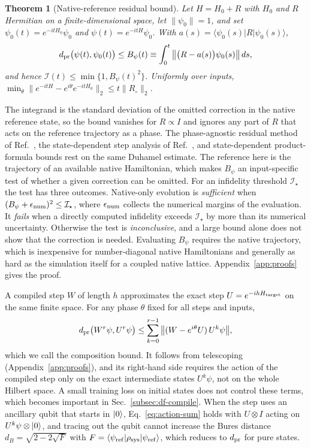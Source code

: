\documentclass[pra,twocolumn,superscriptaddress,nofootinbib,floatfix]{revtex4-2}
\newtheorem{theorem}{Theorem}
\theoremstyle{remark}
\newcommand{\dpr}{d_{\rm pr}}
\begin{document}
\begin{theorem}[Native-reference residual bound]
\label{thm:native-residual}
Let \(H=H_0+R\) with \(H_0\) and \(R\) Hermitian on a finite-dimensional space, let \(\|\psi_0\|=1\), and set \(\psi_0(t)=e^{-itH_0}\psi_0\) and \(\psi(t)=e^{-itH}\psi_0\). With \(a(s)=\langle\psi_0(s)|R|\psi_0(s)\rangle\),
\begin{align}
\dpr\big(\psi(t),\psi_0(t)\big)\le B_\psi(t)\equiv\int_0^t\big\|\big(R-a(s)\big)\psi_0(s)\big\|\,ds ,
\label{eq:native-residual}
\end{align}
and hence \(\mathcal I(t)\le\min\{1,B_\psi(t)^2\}\). Uniformly over inputs, \(\min_\theta\|e^{-itH}-e^{i\theta}e^{-itH_0}\|_2\le t\|R_\circ\|_2\).
\end{theorem}

The integrand is the standard deviation of the omitted correction in the native reference state, so the bound vanishes for \(R\propto I\) and ignores any part of \(R\) that acts on the reference trajectory as a phase. The phase-agnostic residual method of Ref.~\cite{Zoufal2023}, the state-dependent step analysis of Ref.~\cite{Hatomura2022}, and state-dependent product-formula bounds \cite{AnFangLin2021,Burgarth2024Strong} rest on the same Duhamel estimate. The reference here is the trajectory of an available native Hamiltonian, which makes \(B_\psi\) an input-specific test of whether a given correction can be omitted. For an infidelity threshold \(\mathcal I_\star\) the test has three outcomes. Native-only evolution is \emph{sufficient} when \((B_\psi+\epsilon_{\rm num})^2\le\mathcal I_\star\), where \(\epsilon_{\rm num}\) collects the numerical margins of the evaluation. It \emph{fails} when a directly computed infidelity exceeds \(\mathcal I_\star\) by more than its numerical uncertainty. Otherwise the test is \emph{inconclusive}, and a large bound alone does not show that the correction is needed. Evaluating \(B_\psi\) requires the native trajectory, which is inexpensive for number-diagonal native Hamiltonians and generally as hard as the simulation itself for a coupled native lattice. Appendix~\ref{app:proofs} gives the proof.

A compiled step \(W\) of length \(h\) approximates the exact step \(U=e^{-ihH_{\rm target}}\) on the same finite space. For any phase \(\theta\) fixed for all steps and inputs,
\begin{align}
\dpr\big(W^r\psi,U^r\psi\big)\le\sum_{k=0}^{r-1}\big\|(W-e^{i\theta}U)\,U^k\psi\big\| ,
\label{eq:action-sum}
\end{align}
which we call the composition bound. It follows from telescoping (Appendix~\ref{app:proofs}), and its right-hand side requires the action of the compiled step only on the exact intermediate states \(U^k\psi\), not on the whole Hilbert space. A small training loss on initial states does not control these terms, which becomes important in Sec.~\ref{subsec:df-compile}. When the step uses an ancillary qubit that starts in \(\ket{0}\), Eq.~\eqref{eq:action-sum} holds with \(U\otimes I\) acting on \(U^k\psi\otimes\ket{0}\), and tracing out the qubit cannot increase the Bures distance \(d_B=\sqrt{2-2\sqrt F}\) with \(F=\langle\psi_{\rm ref}|\rho_{\rm sys}|\psi_{\rm ref}\rangle\), which reduces to \(\dpr\) for pure states.
\end{document}
